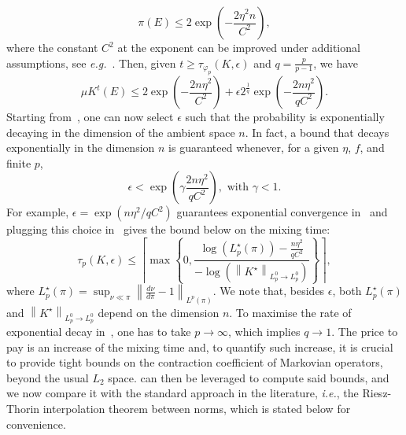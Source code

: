 \documentclass[11pt]{article}
\theoremstyle{plain}
\theoremstyle{remark}
\begin{document}
 \begin{equation}
    \pi(E) \leq 2\exp\left(-\frac{2\eta^2 n}{ C^2 }\right),
\end{equation}
where the constant $C^2$ at the exponent can be improved under additional assumptions, see \emph{e.g.}~\cite{concentrationMeasureII}.
Then, given $t\geq \tau_{\varphi_p}(K,\epsilon)$ and $q=\frac{p}{p-1}$, we have
 \begin{equation}
    \mu K^t(E) \leq 2\exp\left(-\frac{2n\eta^2 }{C^2 }\right) + \epsilon 2^\frac{1}{q}\exp\left(-\frac{2n\eta^2}{q C^2 }\right). \label{eq:probBoundMixing}
\end{equation}
Starting from~, one can now select $\epsilon$ such that the probability is exponentially decaying in the dimension of the ambient space $n$. %
In fact, a bound that decays exponentially in the dimension $n$ is guaranteed whenever, for a given $\eta$, $f$, and finite $p$, 
\begin{equation}
     \epsilon < \exp\left(\gamma\frac{ 2 n \eta^2}{q C^2 } \right), \text{ with } \gamma<1.
\end{equation} 
For example, $\epsilon = \exp\left(n\eta^2/q C^2 \right)$ guarantees exponential convergence in~ and plugging this choice in~ gives the bound below on the mixing time:
   \begin{equation}
       \tau_p(K,\epsilon) \leq \left\lceil\max\left\{0,\frac{\log\left(L_p^\star(\pi)\right)-\frac{n\eta^2}{qC^2}}{-\log\left(\left\lVert K^\star \right\rVert_{L_p^0\to L_p^0} \right)}\right\}\right\rceil,\label{eq:mixingTimeExponentialConvergence}
   \end{equation}
   where $L_p^\star(\pi)=\sup_{\nu\ll\pi} \left\lVert \frac{d\nu}{d\pi}-1\right\rVert_{L^p(\pi)}$. We note that, besides $\epsilon$, both $L_p^\star(\pi)$ and $\left\lVert K^\star \right\rVert_{L_p^0\to L_p^0}$ depend on the dimension $n$. 
To maximise the rate of exponential decay in~, one has to take $p\to\infty$, which implies $q\to 1$. The price to pay is an increase of the mixing time and, %
to quantify such increase, it is crucial to provide tight bounds on the contraction coefficient of Markovian operators, beyond the usual $L_2$ space. 
 can then be leveraged to compute said bounds, and we now compare it with the standard approach in the literature, \textit{i.e.}, the Riesz-Thorin interpolation theorem between norms, which is stated below for convenience. 
\end{document}
